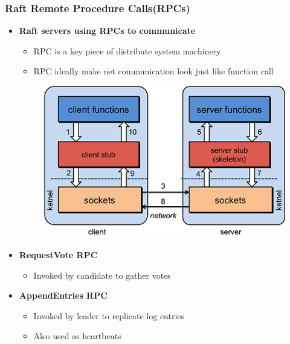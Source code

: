 \begin{frame}
    \frametitle{Raft Remote Procedure Calls(RPCs)}
    \begin{itemize}
        \item \textbf{Raft servers using RPCs to communicate}
            \begin{itemize}
                \item RPC is a key piece of distribute system machinery
                \item RPC ideally make net communication look just like function call
            \end{itemize}
        \begin{figure}
            \centering
            \includegraphics[scale=0.5]{./figures/rpc-flow.png}
        \end{figure}
        \item \textbf{RequestVote RPC}
            \begin{itemize}
                \item Invoked by candidate to gather votes
            \end{itemize}
        \item \textbf{AppendEntries RPC}
            \begin{itemize}
                \item Invoked by leader to replicate log entries
                \item Also used as heartbeats
            \end{itemize}
    \end{itemize}
\end{frame}

